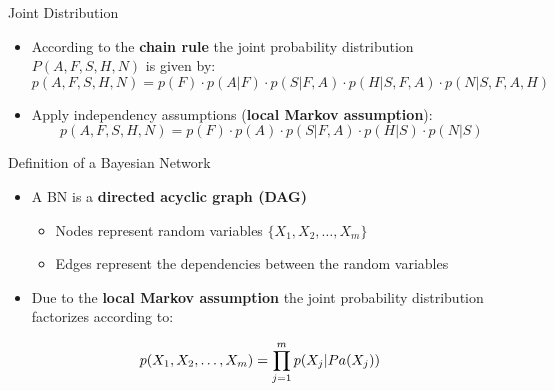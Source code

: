 \begin{frame}{Joint Distribution}{}
	\begin{itemize}
		\item According to the \textbf{chain rule} the joint probability distribution $P(A, F, S, H, N)$ is given by:
		\begin{equation*}
			p(A, F, S, H, N) = p(F) \cdot p(A \vert F) \cdot p(S \vert F, A) \cdot p(H \vert S, F, A) \cdot p(N \vert S, F, A, H)
		\end{equation*}
		\item Apply independency assumptions (\textbf{local Markov assumption}):
		\begin{equation*}
			p(A, F, S, H, N) = p(F) \cdot p(A) \cdot p(S \vert F, A) \cdot p(H \vert S) \cdot p(N \vert S)
		\end{equation*}
	\end{itemize}

	\begin{boxBlueNoFrame}
	\end{boxBlueNoFrame}
\end{frame}


\begin{frame}{Definition of a Bayesian Network}{}
	\begin{itemize}
		\item A BN is a \textbf{directed acyclic graph (DAG)}
		\begin{itemize}
			\item Nodes represent random variables $\{X_1, X_2, \dots, X_m\}$
			\item Edges represent the dependencies between the random variables
		\end{itemize}
		\item Due to the \textbf{local Markov assumption} the joint probability distribution factorizes according to:
	\end{itemize}

	\begin{boxBlue}
		\begin{equation}
			\large
			p(X_1, X_2, \dots, X_m) = \prod_{j=1}^m p(X_j \vert Pa(X_j))
		\end{equation}
	\end{boxBlue}
\end{frame}


